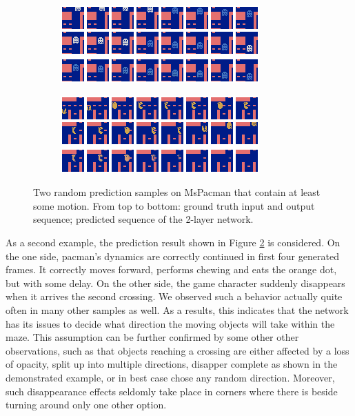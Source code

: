 \begin{figure}[h!tb]
\centering
\begin{subfigure}{0.49\textwidth}
  \centering
  \includegraphics[width=0.92\linewidth]{figures/pred/pac/random/pred-00.png}
  \caption{}
  \label{fig:pac-pred-random1}
\end{subfigure}%
\begin{subfigure}{0.49\textwidth}
  \centering
  \includegraphics[width=0.92\linewidth]{figures/pred/pac/random/pred-04.png}
  \caption{}
  \label{fig:pac-pred-random2}
\end{subfigure}
\caption[Random Prediction Samples on MsPacman]{Two random prediction samples on MsPacman that contain at least some motion. From top to bottom: ground truth input and output sequence; predicted sequence of the 2-layer network.} \label{fig:pac-pred-random}
\end{figure}

As a second example, the prediction result shown in Figure \ref{fig:pac-pred-random2} is considered. On the one side, pacman's dynamics are correctly continued in first four generated frames. It correctly moves forward, performs chewing and eats the orange dot, but with some delay. On the other side, the game character suddenly disappears when it arrives the second crossing. We observed such a behavior actually quite often in many other samples as well. As a results, this indicates that the network has its issues to decide what direction the moving objects will take within the maze. This assumption can be further confirmed by some other other observations, such as that objects reaching a crossing are either affected by a loss of opacity, split up into multiple directions, disapper complete as shown in the demonstrated example, or in best case chose any random direction. Moreover, such disappearance effects seldomly take place in corners where there is beside turning around only one other option.

